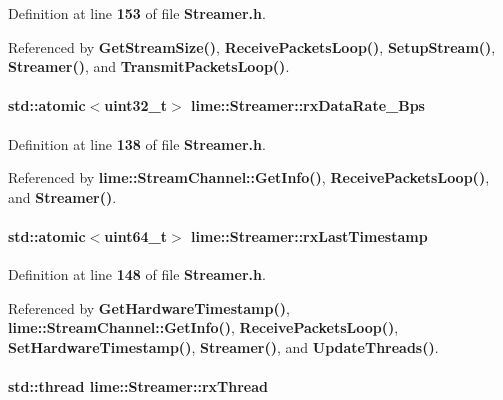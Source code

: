 Definition at line {\bf 153} of file {\bf Streamer.\+h}.



Referenced by {\bf Get\+Stream\+Size()}, {\bf Receive\+Packets\+Loop()}, {\bf Setup\+Stream()}, {\bf Streamer()}, and {\bf Transmit\+Packets\+Loop()}.

\paragraph[{rx\+Data\+Rate\+\_\+\+Bps}]{\setlength{\rightskip}{0pt plus 5cm}std\+::atomic$<$uint32\+\_\+t$>$ lime\+::\+Streamer\+::rx\+Data\+Rate\+\_\+\+Bps}\label{classlime_1_1Streamer_adc125cfae72d5e94f775a3f5e3fdd2e9}


Definition at line {\bf 138} of file {\bf Streamer.\+h}.



Referenced by {\bf lime\+::\+Stream\+Channel\+::\+Get\+Info()}, {\bf Receive\+Packets\+Loop()}, and {\bf Streamer()}.

\paragraph[{rx\+Last\+Timestamp}]{\setlength{\rightskip}{0pt plus 5cm}std\+::atomic$<$uint64\+\_\+t$>$ lime\+::\+Streamer\+::rx\+Last\+Timestamp}\label{classlime_1_1Streamer_a63dbdc66ed33bb6f503605d9c1f66924}


Definition at line {\bf 148} of file {\bf Streamer.\+h}.



Referenced by {\bf Get\+Hardware\+Timestamp()}, {\bf lime\+::\+Stream\+Channel\+::\+Get\+Info()}, {\bf Receive\+Packets\+Loop()}, {\bf Set\+Hardware\+Timestamp()}, {\bf Streamer()}, and {\bf Update\+Threads()}.

\paragraph[{rx\+Thread}]{\setlength{\rightskip}{0pt plus 5cm}std\+::thread lime\+::\+Streamer\+::rx\+Thread}\label{classlime_1_1Streamer_a7417e97c63b56482c2730b6df05a6526}



